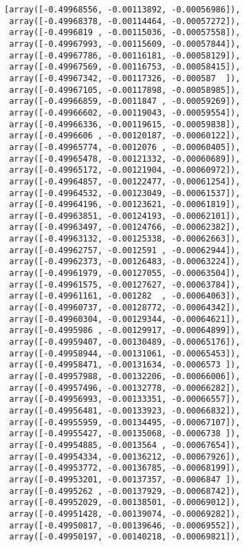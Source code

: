 \documentclass[11pt]{article}
\makeatletter
\newcommand{\boxspacing}{\kern\kvtcb@left@rule\kern\kvtcb@boxsep}
\newcommand{\prompt}[4]{
        {\ttfamily\llap{{\color{#2}[#3]:\hspace{3pt}#4}}\vspace{-\baselineskip}}
    }
\makeatother
\begin{document}
            \begin{tcolorbox}[breakable, size=fbox, boxrule=.5pt, pad at break*=1mm, opacityfill=0]
\prompt{Out}{outcolor}{10}{\boxspacing}
\begin{Verbatim}[commandchars=\\\{\}]
[array([-0.49968556, -0.00113892, -0.00056986]),
 array([-0.49968378, -0.00114464, -0.00057272]),
 array([-0.4996819 , -0.00115036, -0.00057558]),
 array([-0.49967993, -0.00115609, -0.00057844]),
 array([-0.49967786, -0.00116181, -0.00058129]),
 array([-0.49967569, -0.00116753, -0.00058415]),
 array([-0.49967342, -0.00117326, -0.000587  ]),
 array([-0.49967105, -0.00117898, -0.00058985]),
 array([-0.49966859, -0.0011847 , -0.00059269]),
 array([-0.49966602, -0.00119043, -0.00059554]),
 array([-0.49966336, -0.00119615, -0.00059838]),
 array([-0.4996606 , -0.00120187, -0.00060122]),
 array([-0.49965774, -0.0012076 , -0.00060405]),
 array([-0.49965478, -0.00121332, -0.00060689]),
 array([-0.49965172, -0.00121904, -0.00060972]),
 array([-0.49964857, -0.00122477, -0.00061254]),
 array([-0.49964532, -0.00123049, -0.00061537]),
 array([-0.49964196, -0.00123621, -0.00061819]),
 array([-0.49963851, -0.00124193, -0.00062101]),
 array([-0.49963497, -0.00124766, -0.00062382]),
 array([-0.49963132, -0.00125338, -0.00062663]),
 array([-0.49962757, -0.0012591 , -0.00062944]),
 array([-0.49962373, -0.00126483, -0.00063224]),
 array([-0.49961979, -0.00127055, -0.00063504]),
 array([-0.49961575, -0.00127627, -0.00063784]),
 array([-0.49961161, -0.001282  , -0.00064063]),
 array([-0.49960737, -0.00128772, -0.00064342]),
 array([-0.49960304, -0.00129344, -0.00064621]),
 array([-0.4995986 , -0.00129917, -0.00064899]),
 array([-0.49959407, -0.00130489, -0.00065176]),
 array([-0.49958944, -0.00131061, -0.00065453]),
 array([-0.49958471, -0.00131634, -0.0006573 ]),
 array([-0.49957988, -0.00132206, -0.00066006]),
 array([-0.49957496, -0.00132778, -0.00066282]),
 array([-0.49956993, -0.00133351, -0.00066557]),
 array([-0.49956481, -0.00133923, -0.00066832]),
 array([-0.49955959, -0.00134495, -0.00067107]),
 array([-0.49955427, -0.00135068, -0.0006738 ]),
 array([-0.49954885, -0.0013564 , -0.00067654]),
 array([-0.49954334, -0.00136212, -0.00067926]),
 array([-0.49953772, -0.00136785, -0.00068199]),
 array([-0.49953201, -0.00137357, -0.0006847 ]),
 array([-0.4995262 , -0.00137929, -0.00068742]),
 array([-0.49952029, -0.00138501, -0.00069012]),
 array([-0.49951428, -0.00139074, -0.00069282]),
 array([-0.49950817, -0.00139646, -0.00069552]),
 array([-0.49950197, -0.00140218, -0.00069821]),

\end{Verbatim}
\end{tcolorbox}
\end{document}
